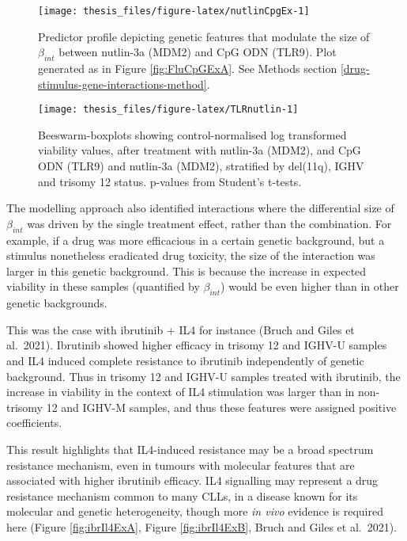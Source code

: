 \documentclass[11pt, a4paper, twosided]{book}
\begin{document}
\begin{figure}

{\centering \texttt{[image: thesis\_files/figure-latex/nutlinCpgEx-1]} 

}

\caption{Predictor profile depicting genetic features that modulate the size of \(\beta_{int}\) between nutlin-3a (MDM2) and CpG ODN (TLR9). Plot generated as in Figure \ref{fig:FluCpGExA}. See Methods section \ref{drug-stimulus-gene-interactions-method}.}\label{fig:nutlinCpgEx}
\end{figure}

\begin{figure}

{\centering \texttt{[image: thesis\_files/figure-latex/TLRnutlin-1]} 

}

\caption{Beeswarm-boxplots showing control-normalised log transformed viability values, after treatment with nutlin-3a (MDM2), and CpG ODN (TLR9) and nutlin-3a (MDM2), stratified by del(11q), IGHV and trisomy 12 status. p-values from Student's t-tests.}\label{fig:TLRnutlin}
\end{figure}
The modelling approach also identified interactions where the differential size of \(\beta_{int}\) was driven by the single treatment effect, rather than the combination. For example, if a drug was more efficacious in a certain genetic background, but a stimulus nonetheless eradicated drug toxicity, the size of the interaction was larger in this genetic background. This is because the increase in expected viability in these samples (quantified by \(\beta_{int}\)) would be even higher than in other genetic backgrounds.

This was the case with ibrutinib + IL4 for instance (Bruch and Giles et al.~2021). Ibrutinib showed higher efficacy in trisomy 12 and IGHV-U samples and IL4 induced complete resistance to ibrutinib independently of genetic background. Thus in trisomy 12 and IGHV-U samples treated with ibrutinib, the increase in viability in the context of IL4 stimulation was larger than in non-trisomy 12 and IGHV-M samples, and thus these features were assigned positive coefficients.

This result highlights that IL4-induced resistance may be a broad spectrum resistance mechanism, even in tumours with molecular features that are associated with higher ibrutinib efficacy. IL4 signalling may represent a drug resistance mechanism common to many CLLs, in a disease known for its molecular and genetic heterogeneity, though more \emph{in vivo} evidence is required here (Figure \ref{fig:ibrIl4ExA}, Figure \ref{fig:ibrIl4ExB}, Bruch and Giles et al.~2021).
\end{document}
